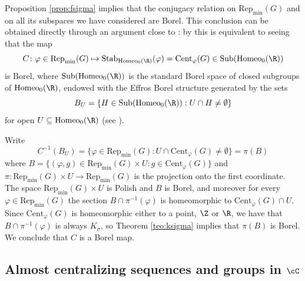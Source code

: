 \documentclass[reqno]{amsart}
\begin{document}
\begin{rmk}
Proposition \ref{prop:fsigma} implies that the conjugacy relation on $\mathrm{Rep}_\mathrm{min}(G)$ and on all its subspaces we have considered are Borel. This conclusion can be obtained directly through an argument close to \cite[Lemma 6.5]{JahelJoseph2025}: by \cite[Theorem 7.1.2]{KB} this is equivalent to seeing that the map
\[
	C \colon \varphi \in \mathrm{Rep}_\mathrm{min}(G) \mapsto \mathrm{Stab}_{\mathrm{Homeo}_0(\R)}(\varphi) = \mathrm{Cent}_\varphi(G) \in \mathrm{Sub}(\mathrm{Homeo}_0(\R))
\]
is Borel, where $\mathrm{Sub}(\mathrm{Homeo}_0(\R))$ is the standard Borel space of closed subgroups of $\mathrm{Homeo}_0(\R)$, endowed with the Effros Borel structure generated by the sets
\[
	B_U = \{H \in \mathrm{Sub}(\mathrm{Homeo}_0(\R)) : U \cap H \neq \emptyset \}
\]
for open $U \subseteq \mathrm{Homeo}_0(\R)$ (see \cite[Proposition 1]{Malicki2011}).

Write
\[	
	C^{-1}(B_U) = \{\varphi \in \mathrm{Rep}_\mathrm{min}(G) : U \cap \mathrm{Cent}_\varphi(G) \neq \emptyset\} = \pi(B)
\]
where $B = \{ (\varphi, g) \in \mathrm{Rep}_\mathrm{min}(G) \times U : g \in \mathrm{Cent}_\varphi(G) \}$ and $\pi \colon \mathrm{Rep}_\mathrm{min}(G) \times U \to \mathrm{Rep}_\mathrm{min}(G)$ is the projection onto the first coordinate. The space $\mathrm{Rep}_\mathrm{min}(G) \times U$ is Polish and $B$ is Borel, and moreover for every $\varphi \in \mathrm{Rep}_\mathrm{min}(G)$ the section $B \cap \pi^{-1}(\varphi)$ is homeomorphic to $\mathrm{Cent}_\varphi(G) \cap U$. Since $\mathrm{Cent}_\varphi(G)$ is homeomorphic either to a point, $\Z$ or $\R$, we have that $B \cap \pi^{-1}(\varphi)$ is always $K_\sigma$, so Theorem \ref{teo:ksigma} implies that $\pi(B)$ is Borel. We conclude that $C$ is a Borel map.
\end{rmk}



\subsection{Almost centralizing sequences and groups in $\cC$} \label{subsection:almostCent}
\end{document}
